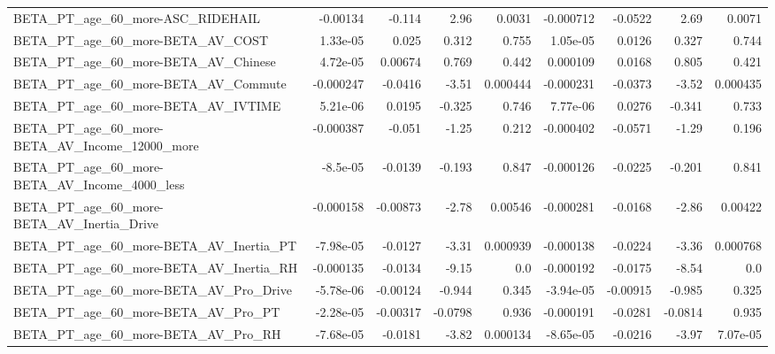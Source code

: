 \begin{tabular}{lrrrrrrrr}
BETA\_PT\_age\_60\_more-ASC\_RIDEHAIL                   &    -0.00134 &       -0.114 &     2.96 &   0.0031 &  -0.000712 &     -0.0522 &         2.69 &        0.0071 \\
BETA\_PT\_age\_60\_more-BETA\_AV\_COST                   &    1.33e-05 &        0.025 &    0.312 &    0.755 &   1.05e-05 &      0.0126 &        0.327 &         0.744 \\
BETA\_PT\_age\_60\_more-BETA\_AV\_Chinese                &    4.72e-05 &      0.00674 &    0.769 &    0.442 &   0.000109 &      0.0168 &        0.805 &         0.421 \\
BETA\_PT\_age\_60\_more-BETA\_AV\_Commute                &   -0.000247 &      -0.0416 &    -3.51 & 0.000444 &  -0.000231 &     -0.0373 &        -3.52 &      0.000435 \\
BETA\_PT\_age\_60\_more-BETA\_AV\_IVTIME                 &    5.21e-06 &       0.0195 &   -0.325 &    0.746 &   7.77e-06 &      0.0276 &       -0.341 &         0.733 \\
BETA\_PT\_age\_60\_more-BETA\_AV\_Income\_12000\_more      &   -0.000387 &       -0.051 &    -1.25 &    0.212 &  -0.000402 &     -0.0571 &        -1.29 &         0.196 \\
BETA\_PT\_age\_60\_more-BETA\_AV\_Income\_4000\_less       &    -8.5e-05 &      -0.0139 &   -0.193 &    0.847 &  -0.000126 &     -0.0225 &       -0.201 &         0.841 \\
BETA\_PT\_age\_60\_more-BETA\_AV\_Inertia\_Drive          &   -0.000158 &     -0.00873 &    -2.78 &  0.00546 &  -0.000281 &     -0.0168 &        -2.86 &       0.00422 \\
BETA\_PT\_age\_60\_more-BETA\_AV\_Inertia\_PT             &   -7.98e-05 &      -0.0127 &    -3.31 & 0.000939 &  -0.000138 &     -0.0224 &        -3.36 &      0.000768 \\
BETA\_PT\_age\_60\_more-BETA\_AV\_Inertia\_RH             &   -0.000135 &      -0.0134 &    -9.15 &      0.0 &  -0.000192 &     -0.0175 &        -8.54 &           0.0 \\
BETA\_PT\_age\_60\_more-BETA\_AV\_Pro\_Drive              &   -5.78e-06 &     -0.00124 &   -0.944 &    0.345 &  -3.94e-05 &    -0.00915 &       -0.985 &         0.325 \\
BETA\_PT\_age\_60\_more-BETA\_AV\_Pro\_PT                 &   -2.28e-05 &     -0.00317 &  -0.0798 &    0.936 &  -0.000191 &     -0.0281 &      -0.0814 &         0.935 \\
BETA\_PT\_age\_60\_more-BETA\_AV\_Pro\_RH                 &   -7.68e-05 &      -0.0181 &    -3.82 & 0.000134 &  -8.65e-05 &     -0.0216 &        -3.97 &      7.07e-05 \\

\end{tabular}
